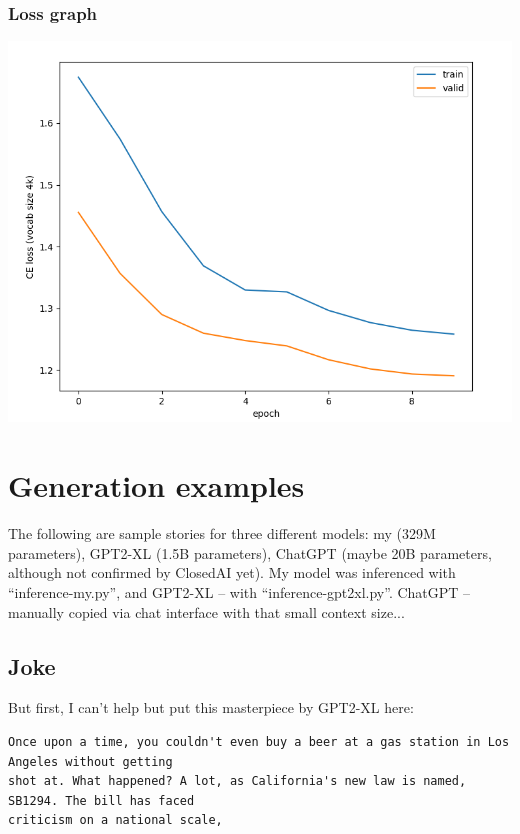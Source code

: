 \documentclass{article}
\begin{document}
\subsubsection*{Loss graph}
\begin{center} \includegraphics[width=400pt]{loss-graph.png} \end{center}

\clearpage


\section{Generation examples}

The following are sample stories for three different models: my (329M parameters), GPT2-XL (1.5B parameters), ChatGPT (maybe 20B parameters, although not confirmed by ClosedAI yet).
My model was inferenced with ``inference-my.py'', and GPT2-XL -- with ``inference-gpt2xl.py''. ChatGPT -- manually copied via chat interface with that small context size...


\subsection{Joke}

But first, I can't help but put this masterpiece by GPT2-XL here:
\begin{verbatim}
Once upon a time, you couldn't even buy a beer at a gas station in Los Angeles without getting
shot at. What happened? A lot, as California's new law is named, SB1294. The bill has faced
criticism on a national scale,
\end{verbatim}
\end{document}
